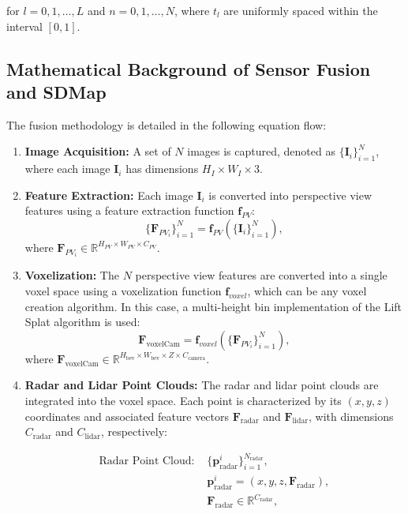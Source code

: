 for \( l = 0, 1, \ldots, L \) and \( n = 0, 1, \ldots, N \), where \( t_l \) are uniformly spaced within the interval \([0, 1]\).


\subsection{Mathematical Background of Sensor Fusion and SDMap}
\label{sup_sec: fusion}

The fusion methodology is detailed in the following equation flow:

\begin{enumerate}
    \item \textbf{Image Acquisition:} A set of $N$ images is captured, denoted as $\{\mathbf{I}_i\}_{i=1}^N$, where each image $\mathbf{I}_i$ has dimensions $H_I \times W_I \times 3$.
    
    \item \textbf{Feature Extraction:} Each image $\mathbf{I}_i$ is converted into perspective view features using a feature extraction function $\mathbf{f}_{PV}$:
    \begin{equation}
        \{\mathbf{F}_{PV_i}\}_{i=1}^N = \mathbf{f}_{PV}(\{\mathbf{I}_i\}_{i=1}^N),
    \end{equation}
    where $\mathbf{F}_{PV_i} \in \mathbb{R}^{H_{PV} \times W_{PV} \times C_{PV}}$.
    
    \item \textbf{Voxelization:} The $N$ perspective view features are converted into a single voxel space using a voxelization function $\mathbf{f}_{voxel}$, which can be any voxel creation algorithm. In this case, a multi-height bin implementation of the Lift Splat algorithm \cite{kalfaoglu2024topomaskv2} is used:
    \begin{equation}
        \mathbf{F}_{\text{voxelCam}} = \mathbf{f}_{voxel}(\{\mathbf{F}_{PV_i}\}_{i=1}^N),
    \end{equation}
    where $\mathbf{F}_{\text{voxelCam}} \in \mathbb{R}^{H_{\text{bev}} \times W_{\text{bev}} \times Z \times C_{\text{camera}}}$.

    
    \item \textbf{Radar and Lidar Point Clouds:} The radar and lidar point clouds are integrated into the voxel space. Each point is characterized by its $(x, y, z)$ coordinates and associated feature vectors $\mathbf{F}_{\text{radar}}$ and $\mathbf{F}_{\text{lidar}}$, with dimensions $C_{\text{radar}}$ and $C_{\text{lidar}}$, respectively:

    \begin{equation}
        \begin{aligned}
        \text{Radar Point Cloud: } &\{\mathbf{p}_{\text{radar}}^i\}_{i=1}^{N_{\text{radar}}}, \\
        &\mathbf{p}_{\text{radar}}^i = (x, y, z, \mathbf{F}_{\text{radar}}), \\
        &\mathbf{F}_{\text{radar}} \in \mathbb{R}^{C_{\text{radar}}},
        \end{aligned}
    \end{equation}


\end{enumerate}
